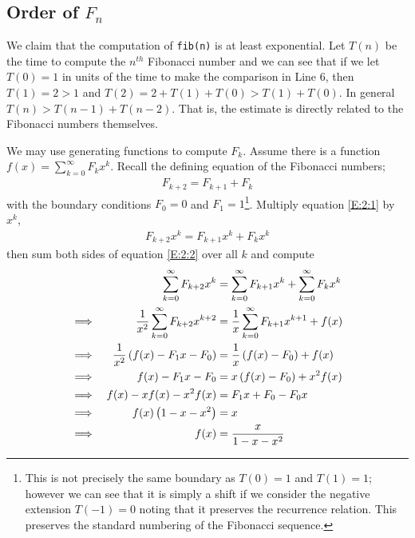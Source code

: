 \documentclass[oneside,12pt]{book}   	%
\newcounter{ex}
\newcounter{def}
\newcounter{pr}
\theoremstyle{definition}
\begin{document}
\begin{spacing}{1.618}
			
		\section{Order of $F_n$}
			We claim that the computation of \texttt{fib(n)} is at least exponential. Let $T(n)$ be the time to compute the $n^{th}$ Fibonacci number and we can see that if we let $T(0)=1$ in units of the time to make the comparison in Line 6, then $T(1)=2 > 1$ and $T(2)=2+T(1)+T(0)> T(1)+T(0)$. In general $T(n)> T(n-1)+T(n-2)$. That is, the estimate is directly related to the Fibonacci numbers themselves.
			
			We may use generating functions to compute $F_k$. Assume there is a function $f(x)=\sum_{k=0}^\infty F_kx^k$. Recall the defining equation of the Fibonacci numbers;
			\begin{alignat}{4}
				F_{k+2}=F_{k+1}+F_k \label{E:2:1}
			\end{alignat}
			with the boundary conditions $F_0=0$ and $F_1=1$\footnote{This is not precisely the same boundary as $T(0)=1$ and $T(1)=1$; however we can see that it is simply a shift if we consider the negative extension $T(-1)=0$ noting that it preserves the recurrence relation. This preserves the standard numbering of the Fibonacci sequence.}. Multiply equation \ref{E:2:1} by $x^k$,
			\begin{alignat}{4}
				F_{k+2}x^k=F_{k+1}x^k+F_kx^k \label{E:2:2}
			\end{alignat}
			then sum both sides of equation \ref{E:2:2} over all $k$ and compute
			\begin{alignat}{4}
					&&\sum_{k=0}^\infty F_{k+2}x^k&=\sum_{k=0}^\infty F_{k+1}x^k +\sum_{k=0}^\infty F_kx^k \notag \\
				\implies &&\frac{1}{x^2}\sum_{k=0}^\infty F_{k+2}x^{k+2}&=\frac{1}{x}\sum_{k=0}^\infty F_{k+1}x^{k+1} +f(x) \notag \\
				\implies && \frac{1}{x^2}\left(f(x)-F_1x-F_0\right)&=\frac{1}{x}\left(f(x)-F_0\right) + f(x) \notag \\
				\implies && f(x)-F_1x-F_0&=x\left(f(x)-F_0\right)+x^2f(x) \notag \\
				\implies && f(x)-xf(x)-x^2f(x)&=F_1x+F_0-F_0x \notag \\
				\implies && f(x)\left(1-x-x^2\right)&=x \notag \\
				\implies && f(x)&=\frac{x}{1-x-x^2} \label{E:2:3}
			\end{alignat}
			

\end{spacing}
\end{document}
